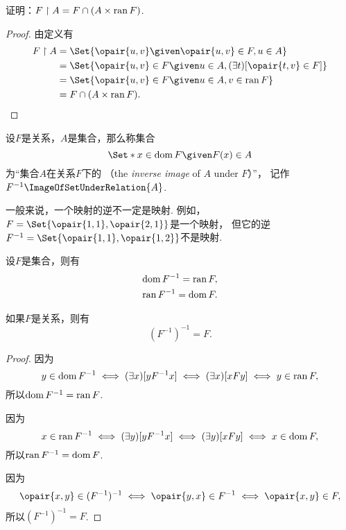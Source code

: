 \begin{example}
证明：\(F \upharpoonright A = F \cap (A \times \operatorname{ran} F)\).
\begin{proof}
由定义有\begin{align*}
	F \setrestrict A
	&= \Set{
		\opair{u,v}
		\given
		\opair{u,v} \in F,
		u \in A
	} \\
	&= \Set{
		\opair{u,v} \in F
		\given
		u \in A,
		(\exists t)[\opair{t,v} \in F]
	} \\
	&= \Set{
		\opair{u,v} \in F
		\given
		u \in A,
		v \in \ran F
	} \\
	&= F \cap (A \times \ran F).
	\qedhere
\end{align*}
\end{proof}
\end{example}

\begin{definition}
设\(F\)是关系，\(A\)是集合，那么称集合\[
	\Set*{ x \in \dom F \given F(x) \in A }
\]为“集合\(A\)在关系\(F\)下的%
（the \emph{inverse image} of \(A\) under \(F\)）”，
记作\(F^{-1}\ImageOfSetUnderRelation{A}\).
\end{definition}

一般来说，一个映射的逆不一定是映射.
例如，\(F=\Set{ \opair{1,1},\opair{2,1} }\)是一个映射，
但它的逆\(F^{-1}=\Set{ \opair{1,1},\opair{1,2} }\)不是映射.

\begin{theorem}\label{theorem:集合论.关系的逆的定义域值域以及关系的二重逆}
设\(F\)是集合，则有\begin{gather}
	\operatorname{dom} F^{-1} = \operatorname{ran} F, \\
	\operatorname{ran} F^{-1} = \operatorname{dom} F.
\end{gather}

如果\(F\)是关系，则有\begin{equation}
	(F^{-1})^{-1} = F.
\end{equation}
\begin{proof}
因为\[
	y \in \operatorname{dom} F^{-1}
	\iff
	(\exists x)[yF^{-1}x]
	\iff
	(\exists x)[xFy]
	\iff
	y \in \operatorname{ran} F,
\]
所以\(\operatorname{dom} F^{-1} = \operatorname{ran} F\).

因为\[
	x \in \operatorname{ran} F^{-1}
	\iff
	(\exists y)[yF^{-1}x]
	\iff
	(\exists y)[xFy]
	\iff
	x \in \operatorname{dom} F,
\]
所以\(\operatorname{ran} F^{-1} = \operatorname{dom} F\).

因为\[
	\opair{x,y} \in (F^{-1})^{-1}
	\iff
	\opair{y,x} \in F^{-1}
	\iff
	\opair{x,y} \in F,
\]
所以\((F^{-1})^{-1} = F\).
\end{proof}
\end{theorem}

